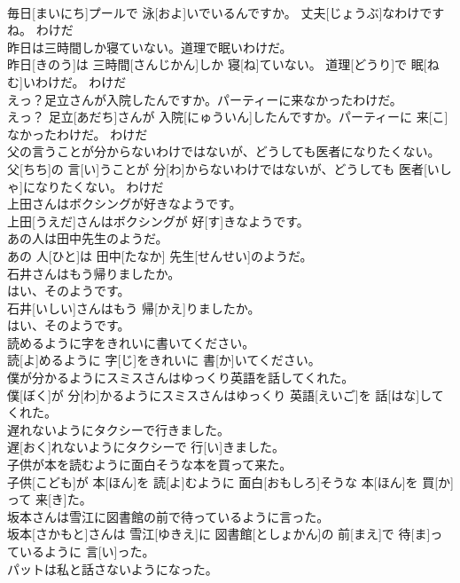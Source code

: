 \documentclass[8pt]{extreport}
\begin{document}
\begin{CJK}{UTF8}{min}
\\	毎日[まいにち]プールで 泳[およ]いでいるんですか。 丈夫[じょうぶ]なわけですね。	わけだ 
\\	昨日は三時間しか寝ていない。道理で眠いわけだ。	
\\	昨日[きのう]は 三時間[さんじかん]しか 寝[ね]ていない。 道理[どうり]で 眠[ねむ]いわけだ。	わけだ 
\\	えっ？足立さんが入院したんですか。パーティーに来なかったわけだ。	
\\	えっ？ 足立[あだち]さんが 入院[にゅういん]したんですか。パーティーに 来[こ]なかったわけだ。	わけだ 
\\	父の言うことが分からないわけではないが、どうしても医者になりたくない。	
\\	父[ちち]の 言[い]うことが 分[わ]からないわけではないが、どうしても 医者[いしゃ]になりたくない。	わけだ 
\\	上田さんはボクシングが好きなようです。	
\\	上田[うえだ]さんはボクシングが 好[す]きなようです。	
\\	あの人は田中先生のようだ。	
\\	あの 人[ひと]は 田中[たなか] 先生[せんせい]のようだ。	
\\	石井さんはもう帰りましたか。 
\\	はい、そのようです。	
\\	石井[いしい]さんはもう 帰[かえ]りましたか。 
\\	はい、そのようです。	
\\	読めるように字をきれいに書いてください。	
\\	読[よ]めるように 字[じ]をきれいに 書[か]いてください。	
\\	僕が分かるようにスミスさんはゆっくり英語を話してくれた。	
\\	僕[ぼく]が 分[わ]かるようにスミスさんはゆっくり 英語[えいご]を 話[はな]してくれた。	
\\	遅れないようにタクシーで行きました。	
\\	遅[おく]れないようにタクシーで 行[い]きました。	
\\	子供が本を読むように面白そうな本を買って来た。	
\\	子供[こども]が 本[ほん]を 読[よ]むように 面白[おもしろ]そうな 本[ほん]を 買[か]って 来[き]た。	
\\	坂本さんは雪江に図書館の前で待っているように言った。	
\\	坂本[さかもと]さんは 雪江[ゆきえ]に 図書館[としょかん]の 前[まえ]で 待[ま]っているように 言[い]った。	
\\	パットは私と話さないようになった。	

\end{CJK}
\end{document}
